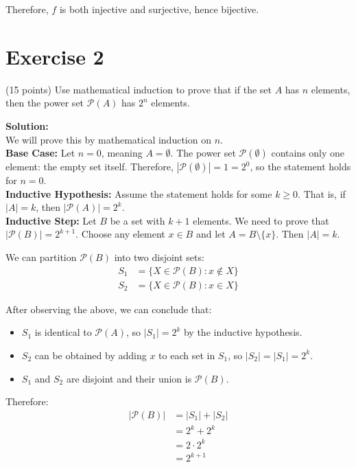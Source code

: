 \documentclass{article}
\begin{document}
Therefore, $f$ is both injective and surjective, hence bijective.

\newpage

\section*{Exercise 2}
(15 points) Use mathematical induction to prove that if the set $A$ has $n$ elements, then the power set $\mathcal{P}(A)$ has $2^n$ elements.

\textbf{Solution:} \\

We will prove this by mathematical induction on $n$. \\

\textbf{Base Case:} Let $n = 0$, meaning $A = \emptyset$.
The power set $\mathcal{P}(\emptyset)$ contains only one element: the empty set itself.
Therefore, $|\mathcal{P}(\emptyset)| = 1 = 2^0$, so the statement holds for $n = 0$. \\

\textbf{Inductive Hypothesis:} 
Assume the statement holds for some $k \geq 0$. That is, if $|A| = k$, then $|\mathcal{P}(A)| = 2^k$. \\

\textbf{Inductive Step:} 
Let $B$ be a set with $k+1$ elements. We need to prove that $|\mathcal{P}(B)| = 2^{k+1}$.
Choose any element $x \in B$ and let $A = B \setminus \{x\}$. Then $|A| = k$.

We can partition $\mathcal{P}(B)$ into two disjoint sets:
\begin{align*}
S_1 &= \{X \in \mathcal{P}(B) : x \notin X\} \\
S_2 &= \{X \in \mathcal{P}(B) : x \in X\}
\end{align*}

After observing the above, we can conclude that:
\begin{itemize}
\item $S_1$ is identical to $\mathcal{P}(A)$, so $|S_1| = 2^k$ by the inductive hypothesis.
\item $S_2$ can be obtained by adding $x$ to each set in $S_1$, so $|S_2| = |S_1| = 2^k$.
\item $S_1$ and $S_2$ are disjoint and their union is $\mathcal{P}(B)$.
\end{itemize}

Therefore:
\begin{align*}
|\mathcal{P}(B)| &= |S_1| + |S_2| \\
&= 2^k + 2^k \\
&= 2 \cdot 2^k \\
&= 2^{k+1}
\end{align*}
\end{document}
